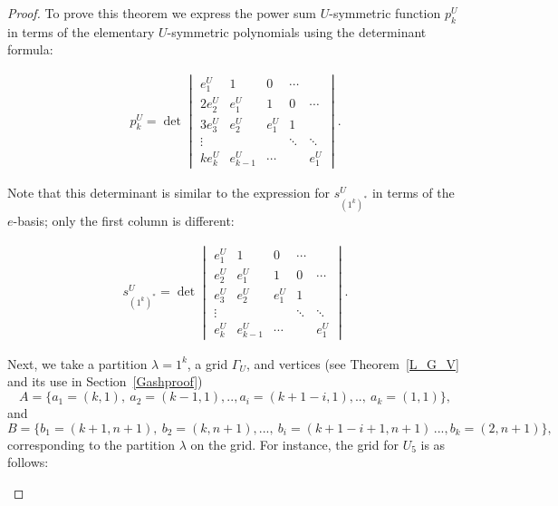 \documentclass{article}
\theoremstyle{plain}
\theoremstyle{definition}
\begin{document}
\begin{proof}
To prove this theorem we express the power sum $U$-symmetric function $p_k^U$ in terms of the elementary $U$-symmetric polynomials using the determinant formula:


\begin{align}
  p^U_k = \det\begin{vmatrix}
    e^U_1    & 1         & 0      & \cdots          \\
    2e^U_2   & e^U_1       & 1      & 0      & \cdots \\
    3e^U_3   & e^U_2       & e^U_1    & 1               \\
    \vdots &           &        & \ddots & \ddots \\
    ke^U_k   & e^U_{k - 1} & \cdots &        & e^U_1
  \end{vmatrix}.
\end{align}


Note that this determinant is similar to the expression for $s^U_{(1^k)^*}$ in terms of the $e$-basis; only the first column is different:

 \begin{align}
  s^U_{(1^k)^*} = \det\begin{vmatrix}
    e^U_1    & 1         & 0      & \cdots          \\
    e^U_2   & e^U_1       & 1      & 0      & \cdots \\
    e^U_3   & e^U_2       & e^U_1    & 1               \\
    \vdots &           &        & \ddots & \ddots \\
    e^U_k   & e^U_{k - 1} & \cdots &        & e^U_1
  \end{vmatrix}.
\end{align}


Next, we take a partition $\lambda = 1^k$, a grid $\Gamma_U$, and vertices (see Theorem~\ref{L_G_V} and its use in Section~\ref{Gashproof}) $$A=\{a_1=(k,1),\
a_2=(k-1,1),..,a_i=(k+1-i,1),..,\ a_k =(1,1)\},$$
and $$B=\{b_1=(k+1,n+1),\ b_2=(k,n+1),...,\ b_i
=(k+1-i+1,n+1)\,...,b_k=(2,n+1)\},$$ corresponding to the partition $\lambda$ on the grid. For instance, the grid for $U_5$ is as follows:  


\begin{figure}[H]
\hspace*{-0.5cm} 
\end{figure}
\end{proof}
\end{document}
